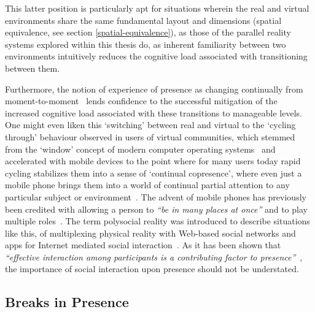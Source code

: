 This latter position is particularly apt for situations wherein the real and virtual environments share the same fundamental layout and dimensions (spatial equivalence, see section \ref{spatial-equivalence}), as those of the parallel reality systems explored within this thesis do, as inherent familiarity between two environments intuitively reduces the cognitive load associated with transitioning between them.

Furthermore, the notion of experience of presence as changing continually from moment-to-moment~\cite{Heeter2003, Ijsselsteijn1998} lends confidence to the successful mitigation of the increased cognitive load associated with these transitions to manageable levels. One might even liken this `switching' between real and virtual to the `cycling through' behaviour observed in users of virtual communities, which stemmed from the `window' concept of modern computer operating systems~\cite{Turkle2004} and accelerated with mobile devices to the point where for many users today rapid cycling stabilizes them into a sense of `continual copresence', where even just a mobile phone brings them into a world of continual partial attention to any particular subject or environment~\cite{Turkle2011}. The advent of mobile phones has previously been credited with allowing a person to \textit{``be in many places at once''} and to play multiple roles~\cite{Terashima2001}. The term polysocial reality was introduced to describe situations like this, of multiplexing physical reality with Web-based social networks and apps for Internet mediated social interaction~\cite{Applin2012}. As it has been shown that \textit{``effective interaction among participants is a contributing factor to presence''}~\cite{Terashima2001}, the importance of social interaction upon presence should not be understated.



\subsection{Breaks in Presence}

\label{background-breaks-in-presence}

